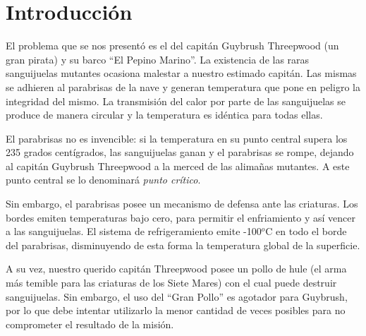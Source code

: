 \hypersetup{
    colorlinks,
    citecolor=black,
    filecolor=black,
    linkcolor=black,
    urlcolor=black
}


\lstset{escapechar=@,style=customc}




\fecha{\today}




\maketitle

\tableofcontents
\newpage

\section*{Introducción}

El problema que se nos presentó es el del capitán Guybrush Threepwood (un gran pirata) y su barco ``El Pepino Marino''. La existencia de las raras sanguijuelas mutantes ocasiona malestar a nuestro estimado capitán. Las mismas se adhieren al parabrisas de la nave y generan temperatura que pone en peligro la integridad del mismo. La transmisión del calor por parte de las sanguijuelas se produce de manera circular y la temperatura es idéntica para todas ellas. 
\par 
El parabrisas no es invencible: si la temperatura en su punto central supera los 235 grados centígrados, las sanguijuelas ganan y el parabrisas se rompe, dejando al capitán Guybrush Threepwood a la merced de las alimañas mutantes. A este punto central se lo denominará \textit{punto crítico}.
\par 
Sin embargo, el parabrisas posee un mecanismo de defensa ante las criaturas. Los bordes emiten temperaturas bajo cero, para permitir el enfriamiento y así vencer a las sanguijuelas. El sistema de refrigeramiento emite -100$^{o}$C en todo el borde del parabrisas, disminuyendo de esta forma la temperatura global de la superficie. 
\par 
A su vez, nuestro querido capitán Threepwood posee un pollo de hule (el arma más temible para las criaturas de los Siete Mares) con el cual puede destruir sanguijuelas. Sin embargo, el uso del ``Gran Pollo'' es agotador para Guybrush, por lo que debe intentar utilizarlo la menor cantidad de veces posibles para no comprometer el resultado de la misión. 

